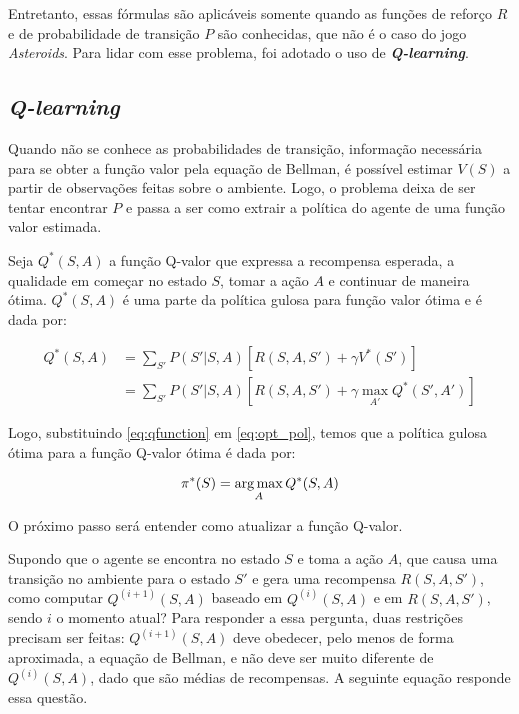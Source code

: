 Entretanto, essas fórmulas são aplicáveis somente quando as funções de reforço $R$ e de probabilidade de transição $P$ são conhecidas, que não é o caso do jogo \textit{Asteroids}. Para lidar com esse problema, foi adotado o uso de \textit{\textbf{Q-learning}}.

\subsection{\textit{Q-learning}}
\label{sec:ql}

Quando não se conhece as probabilidades de transição, informação necessária para se obter a função valor pela equação de Bellman, é possível estimar $V(S)$ a partir de observações feitas sobre o ambiente. Logo, o problema deixa de ser tentar encontrar $P$ e passa a ser como extrair a política do agente de uma função valor estimada.

Seja $Q^{*}(S,A)$ a função Q-valor que expressa a recompensa esperada, a qualidade em começar no estado $S$, tomar a ação $A$ e continuar de maneira ótima. $Q^{*}(S,A)$ é uma parte da política gulosa para função valor ótima e é dada por:

\begin{equation} \label{eq:qfunction}
\begin{align*}
Q^{*}(S,A) &= \sum_{S'}P(S'|S,A)[R(S,A,S') + \gamma V^{*}(S')] \\
        &= \sum_{S'}P(S'|S,A)[R(S,A,S') + \gamma \max_{A'}Q^{*}(S',A')]
\end{align*}
\end{equation}

Logo, substituindo \ref{eq:qfunction} em \ref{eq:opt_pol}, temos que a política gulosa ótima para a função Q-valor ótima é dada por:

\begin{equation} \label{eq:q_opt_pol}
\pi^{*}(S) = \operatorname*{arg\,max}_{A}Q^{*}(S,A)
\end{equation}

O próximo passo será entender como atualizar a função Q-valor.

Supondo que o agente se encontra no estado $S$ e toma a ação $A$, que causa uma transição no ambiente para o estado $S'$ e gera uma recompensa $R(S,A,S')$, como computar $Q^{(i+1)}(S,A)$ baseado em $Q^{(i)}(S,A)$ e em $R(S,A,S')$, sendo $i$ o momento atual? Para responder a essa pergunta, duas restrições precisam ser feitas: $Q^{(i+1)}(S,A)$ deve obedecer, pelo menos de forma aproximada, a equação de Bellman, e não deve ser muito diferente de $Q^{(i)}(S,A)$, dado que são médias de recompensas. A seguinte equação responde essa questão.

